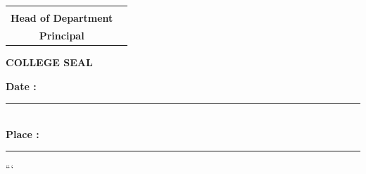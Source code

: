 \begin{center}
\vspace{2.2cm}


\begin{tabular}{cc}
\begin{minipage}{0.42\textwidth}
\centering
\rule{5cm}{0.2px}\\
\textbf{Head of Department}
\end{minipage}
&
\begin{minipage}{0.42\textwidth}
\centering
\rule{5cm}{0.2px}\\
\textbf{Principal}
\end{minipage}
\end{tabular}

\vspace{1.5cm}


\textbf{COLLEGE SEAL}

\vspace{2cm}

\begin{flushleft}
\textbf{Date :} \rule{4cm}{0.2px}\\[0.4cm]
\textbf{Place :} \rule{4cm}{0.2px}
\end{flushleft}

\end{center}
```

